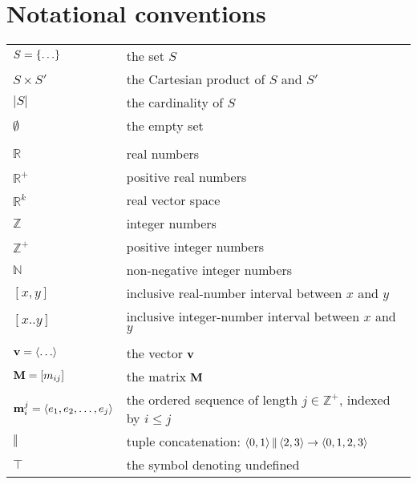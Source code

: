 \chapter{Notational conventions}
\label{sec:notation}

\begin{center}
  \begin{tabu}{ll}
    \(S=\left \{ \ldots \right \}\) & the set \(S\)\\
    \(S \times S'\) & the Cartesian product of \(S\) and \(S'\)\\
    \(\rvert S \rvert\) & the cardinality of \(S\)\\
    \(\emptyset\) & the empty set\\
                         & \\
    \(\mathbb{R}\) & real numbers\\
    \(\mathbb{R^+}\) & positive real numbers\\
    \(\mathbb{R}^k\) &  real vector space\\
    \(\mathbb{Z}\) & integer numbers\\
    \(\mathbb{Z^+}\) & positive integer numbers\\
    \(\mathbb{N}\) & non-negative integer numbers\\
    \([x,y]\) & inclusive real-number interval between \(x\) and \(y\)\\
    \([x..y]\) & inclusive integer-number interval between \(x\) and \(y\)\\
                         & \\
    \(\mathbf{v}=\left \langle \ldots \right \rangle \) & the vector \(\mathbf{v}\)\\
    \(\mathbf{M} = [m_{ij}]\) & the matrix \(\mathbf{M}\)\\
    \(\mathbf{m}_i^j =\left \langle e_1, e_2, \ldots, e_j \right \rangle \) & the ordered sequence of length \(j \in \mathbb{Z}^+\), indexed by \(i \le j\)\\
    \(\Vert\) & tuple concatenation: \(\left \langle 0,1 \right \rangle  \Vert \left \langle 2,3 \right \rangle  \to \left \langle 0,1,2,3 \right \rangle \)\\
    \(\top\) & the symbol denoting undefined\\
  \end{tabu}
\end{center}
